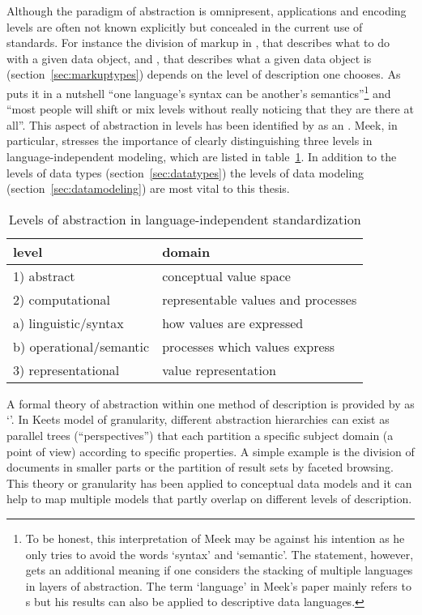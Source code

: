 Although the paradigm of abstraction is omnipresent, applications and encoding
levels are often not known explicitly but concealed in the current use of
standards. For instance the division of markup in ,
that describes what to do with a given data object, and ,
that describes what a given data object is (section~\ref{sec:markuptypes})
depends on the level of description one chooses. As \textcite{Meek1995} puts it
in a nutshell ``one language's syntax can be another's semantics''\footnote{To
be honest, this interpretation of Meek may be against his intention as he only
tries to avoid the words `syntax' and `semantic'. The statement, however, gets
an additional meaning if one considers the stacking of multiple languages in
layers of abstraction. The term `language' in Meek's paper mainly refers to
s but his results can also be applied to descriptive
data languages.} and ``most people will shift or mix levels without really
noticing that they are there at all''. This aspect of abstraction in levels has
been identified by \textcite{Eco1979} as an .  Meek,
in particular, stresses the importance of clearly distinguishing three levels
in language-independent modeling, which are listed in
table~\ref{tab:meekslevels}. In addition to the levels of data types
(section~\ref{sec:datatypes}) the levels of data modeling
(section~\ref{sec:datamodeling}) are most vital to this thesis.

\begin{table}
\center
\begin{tabular}{|l|l|}
\hline
\textbf{level} & \textbf{domain} \\
\hline
1) abstract & conceptual value space \\
2) computational  &  representable values and processes \\
\hspace{1em}a) linguistic/syntax  & how values are expressed \\
\hspace{1em}b) operational/semantic & processes which values express \\
3) representational & value representation \\
\hline
\end{tabular}
\caption{Levels of abstraction in language-independent standardization}
\label{tab:meekslevels}
\end{table}

A formal theory of abstraction within one method of description is provided by
\textcite{Keet2007,Keet2008c,Keet2011} as `'. In Keets model
of granularity, different abstraction hierarchies can exist as parallel trees
(``perspectives'') that each partition a specific subject domain (a point of
view) according to specific properties. A simple example is the division of
documents in smaller parts or the partition of result sets by faceted browsing.
This theory or granularity has been applied to conceptual data models
\cite{Keet2007} and it can help to map multiple models that partly overlap on
different levels of description.


